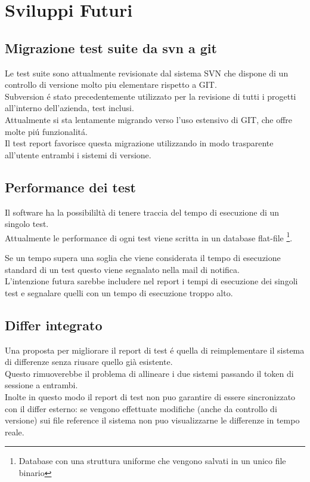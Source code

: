 \chapter{Sviluppi Futuri}
    \section{Migrazione test suite da svn a git}
        Le test suite sono attualmente revisionate dal sistema SVN che dispone di un controllo di versione molto piu elementare rispetto a GIT.\\

        Subversion \'e stato precedentemente utilizzato per la revisione di tutti i progetti all'interno dell'azienda, test inclusi.\\
        Attualmente si sta lentamente migrando verso l'uso estensivo di GIT, che offre molte pi\'u funzionalit\'a.\\

        Il test report favorisce questa migrazione utilizzando in modo trasparente all'utente entrambi i sistemi di versione. 
    \section{Performance dei test}
        Il software ha la possibililtà di tenere traccia del tempo di esecuzione di un singolo test.\\
        Attualmente le performance di ogni test viene scritta in un database flat-file \footnote{Database con una struttura uniforme che vengono salvati in un unico file binario}.

        Se un tempo supera una soglia che viene considerata il tempo di esecuzione standard di un test questo viene segnalato nella mail di notifica.\\
        L'intenzione futura sarebbe includere nel report i tempi di esecuzione dei singoli test e segnalare quelli con un tempo di esecuzione troppo alto.\\
    \section{Differ integrato}
        Una proposta per migliorare il report di test \'e quella di reimplementare il sistema di differenze senza riusare quello già esistente.\\
        Questo rimuoverebbe il problema di allineare i due sistemi passando il token di sessione a entrambi.\\
        Inolte in questo modo il report di test non puo garantire di essere sincronizzato con il differ esterno: se vengono effettuate modifiche (anche da controllo di versione) sui file reference il sistema non puo visualizzarne le differenze in tempo reale.\\
        

